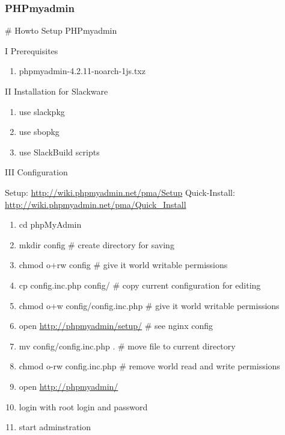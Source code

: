 \documentclass[letterpaper,10pt,english]{sphinxmanual}
\begin{document}
\subsubsection{PHPmyadmin}
\label{sdocs/databases/phpmyadmin/phpmyadmin:phpmyadmin}\label{sdocs/databases/phpmyadmin/phpmyadmin::doc}
\# Howto Setup PHPmyadmin

I Prerequisites
\begin{enumerate}
\item {} 
phpmyadmin-4.2.11-noarch-1js.txz

\end{enumerate}

II Installation for Slackware
\begin{enumerate}
\item {} 
use slackpkg

\item {} 
use sbopkg

\item {} 
use SlackBuild scripts

\end{enumerate}

III Configuration

Setup: \href{http://wiki.phpmyadmin.net/pma/Setup}{http://wiki.phpmyadmin.net/pma/Setup}
Quick-Install: \href{http://wiki.phpmyadmin.net/pma/Quick\_Install}{http://wiki.phpmyadmin.net/pma/Quick\_Install}
\begin{enumerate}
\item {} 
cd phpMyAdmin

\item {} 
mkdir config                        \# create directory for saving

\item {} 
chmod o+rw config                   \# give it world writable permissions

\item {} 
cp config.inc.php config/           \# copy current configuration for editing

\item {} 
chmod o+w config/config.inc.php     \# give it world writable permissions

\item {} 
open \href{http://phpmyadmin/setup/}{http://phpmyadmin/setup/}       \# see nginx config

\item {} 
mv config/config.inc.php .          \# move file to current directory

\item {} 
chmod o-rw config.inc.php           \# remove world read and write permissions

\item {} 
open \href{http://phpmyadmin/}{http://phpmyadmin/}

\item {} 
login with root login and password

\item {} 
start adminstration

\end{enumerate}
\end{document}
